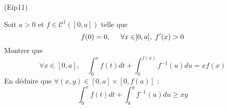 \begin{tiny}(Eip11)\end{tiny}
Soit $a>0$ et $f\in \mathcal{C}^{1}(\left[ 0,a\right] )$ telle que
\begin{displaymath}
f(0)=0,\hspace{0.5cm} \forall x\in ]0,a], \;f'(x)>0  
\end{displaymath}
Montrer que
\[
\forall x\in \left[ 0,a\right] ,\quad
\int_{0}^{x}f(t)dt+\int_{0}^{f(x)}f^{-1}(u)du=xf(x)
\]
En d{\'e}duire que $\forall (x,y)\in \left[ 0,a\right] \times
\left[ 0,f(a)\right] $ :
\[
\int_{0}^{x}f(t)dt+\int_{0}^{y}f^{-1}(u)du\geq xy
\]
